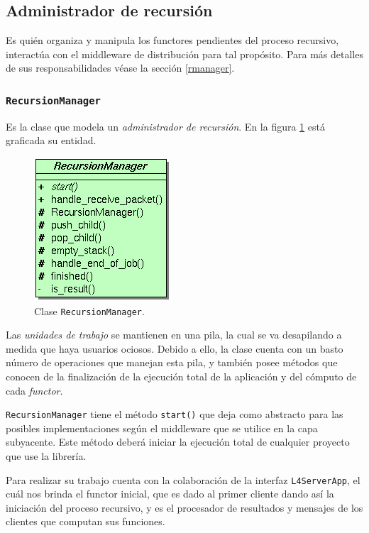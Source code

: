\subsection{Administrador de recursión}
    Es quién organiza y manipula los functores pendientes del proceso recursivo, interactúa con el middleware de
distribución para tal propósito. Para más detalles de sus responsabilidades véase la sección \ref{rmanager}.

\subsubsection{\texttt{RecursionManager}}

Es la clase que modela un \textit{administrador de recursión}. En la figura \ref{recursion_manager} está graficada su entidad.

\begin{figure}[ht] \hspace{4.7cm}
    \includegraphics[scale=.6]{images/recursion_manager.png}
    \caption{Clase \texttt{RecursionManager}.}
    \label{recursion_manager}
\end{figure}

Las \textit{unidades de trabajo} se mantienen en una pila, la cual se va desapilando a medida que haya usuarios ociosos. Debido a ello, la
clase cuenta con un basto número de operaciones que manejan esta pila, y también posee métodos que conocen de la finalización de la
ejecución total de la aplicación y del cómputo de cada \textit{functor}.

\texttt{RecursionManager} tiene el método \texttt{start()} que deja como abstracto para las posibles implementaciones según el middleware
que se utilice en la capa subyacente. Este método deberá iniciar la ejecución total de cualquier proyecto que use la librería.

Para realizar su trabajo cuenta con la colaboración de la interfaz \texttt{L4ServerApp}, el cuál nos brinda el functor inicial, que es dado
al primer cliente dando así la iniciación del proceso recursivo, y es el procesador de resultados y mensajes de los clientes que computan
sus funciones.

